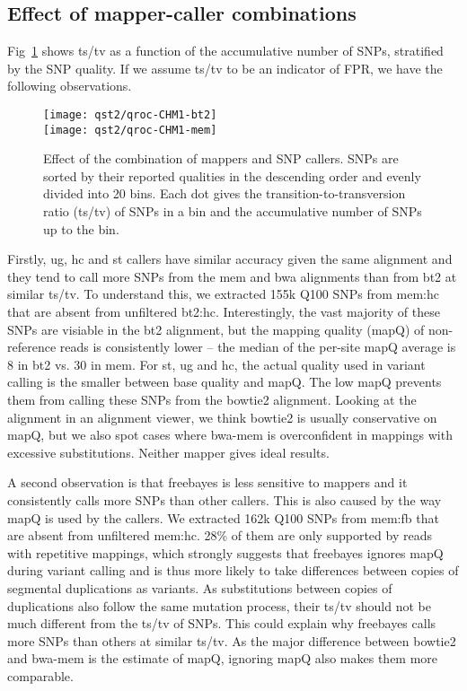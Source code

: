 \documentclass{bioinfo}
\newcommand{\textssf}[1]{\textsf{\footnotesize #1}}
\begin{document}
\subsection{Effect of mapper-caller combinations}

Fig~\ref{fig:qroc1} shows ts/tv as a function of the accumulative number of
SNPs, stratified by the SNP quality. If we assume ts/tv to be an indicator of
FPR, we have the following observations.

\begin{figure}[!hp]
\centering\texttt{[image: qst2/qroc-CHM1-bt2]}\\
\centering\texttt{[image: qst2/qroc-CHM1-mem]}
\caption{Effect of the combination of mappers and SNP callers. SNPs are sorted
by their reported qualities in the descending order and evenly divided into 20
bins. Each dot gives the transition-to-transversion ratio (ts/tv) of SNPs in a
bin and the accumulative number of SNPs up to the bin.}\label{fig:qroc1} \end{figure}

Firstly, \textssf{ug}, \textssf{hc} and \textssf{st} callers have similar
accuracy given the same alignment and they tend to call more SNPs from the
\textssf{mem} and \textssf{bwa} alignments than from \textssf{bt2} at similar
ts/tv. To understand this, we extracted 155k Q100 SNPs from \textssf{mem:hc}
that are absent from unfiltered \textssf{bt2:hc}. Interestingly, the vast
majority of these SNPs are visiable in the \textssf{bt2} alignment, but the
mapping quality (mapQ) of non-reference reads is consistently lower -- the
median of the per-site mapQ average is 8 in \textssf{bt2} vs. 30 in \textssf{mem}.
For \textssf{st}, \textssf{ug} and \textssf{hc}, the actual quality used in
variant calling is the smaller between base quality and mapQ. The low mapQ
prevents them from calling these SNPs from the \textssf{bowtie2} alignment.
Looking at the alignment in an alignment viewer, we think \textssf{bowtie2} is
usually conservative on mapQ, but we also spot cases where bwa-mem is
overconfident in mappings with excessive substitutions. Neither mapper gives
ideal results.

A second observation is that \textssf{freebayes} is less sensitive to mappers and it
consistently calls more SNPs than other callers. This is also caused by the way
mapQ is used by the callers. We extracted 162k Q100 SNPs from \textssf{mem:fb}
that are absent from unfiltered \textssf{mem:hc}. 28\% of them are only
supported by reads with repetitive mappings, which strongly suggests that
\textssf{freebayes} ignores mapQ during variant calling and is thus more likely
to take differences between copies of segmental duplications as variants. As
substitutions between copies of duplications also follow the same mutation
process, their ts/tv should not be much different from the ts/tv of SNPs. This
could explain why \textssf{freebayes} calls more SNPs than others at similar
ts/tv. As the major difference between \textssf{bowtie2} and \textssf{bwa-mem}
is the estimate of mapQ, ignoring mapQ also makes them more comparable.
\end{document}
